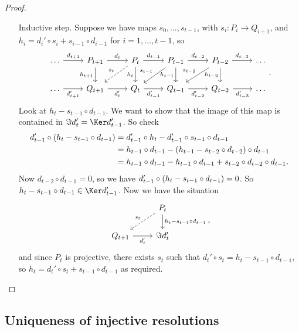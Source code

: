 \begin{proof}
\begin{enumerate}
\begin{itemize}[leftmargin=1in]
\item[Inductive step.] Suppose we have maps $ s_0, \dots, s_{t - 1} $, with $ s_i : P_i \to Q_{i + 1} $, and $ h_i = d_i' \circ s_i + s_{i - 1} \circ d_{i - 1} $ for $ i = 1, \dots, t - 1 $, so
$$
\begin{tikzcd}
\dots \arrow{r}{d_{t + 1}} & P_{t + 1} \arrow{r}{d_t} \arrow[swap]{d}{h_{t + 1}} & P_t \arrow{r}{d_{t - 1}} \arrow[dashed, swap]{dl}{s_t} \arrow[swap]{d}{h_t} & P_{t - 1} \arrow{r}{d_{t - 2}} \arrow[swap]{dl}{s_{t - 1}} \arrow[swap]{d}{h_{t - 1}} & P_{t - 2} \arrow{r}{d_{t - 3}} \arrow[swap]{dl}{s_{t - 2}} \arrow[swap]{d}{h_{t - 2}} & \dots \\
\dots \arrow[swap]{r}{d_{t + 1}'} & Q_{t + 1} \arrow[swap]{r}{d_t'} & Q_t \arrow[swap]{r}{d_{t - 1}'} & Q_{t - 1} \arrow[swap]{r}{d_{t - 2}'} & Q_{t - 2} \arrow[swap]{r}{d_{t - 3}'} & \dots
\end{tikzcd}.
$$
Look at $ h_t - s_{t - 1} \circ d_{t - 1} $. We want to show that the image of this map is contained in $ \Im d_t' = \Ker d_{t - 1}' $. So check
\begin{align*}
d_{t - 1}' \circ \br{h_t - s_{t - 1} \circ d_{t - 1}}
& = d_{t - 1}' \circ h_t - d_{t - 1}' \circ s_{t - 1} \circ d_{t - 1} \\
& = h_{t - 1} \circ d_{t - 1} - \br{h_{t - 1} - s_{t - 2} \circ d_{t - 2}} \circ d_{t - 1} \\
& = h_{t - 1} \circ d_{t - 1} - h_{t - 1} \circ d_{t - 1} + s_{t - 2} \circ d_{t - 2} \circ d_{t - 1}.
\end{align*}
Now $ d_{t - 2} \circ d_{t - 1} = 0 $, so we have $ d_{t - 1}' \circ \br{h_t - s_{t - 1} \circ d_{t - 1}} = 0 $. So $ h_t - s_{t - 1} \circ d_{t - 1} \in \Ker d_{t - 1}' $. Now we have the situation
$$
\begin{tikzcd}
& P_t \arrow[dashed, swap]{dl}{s_t} \arrow{d}{h_t - s_{t - 1} \circ d_{t - 1}} \\
Q_{t + 1} \arrow[swap]{r}{d_t'} & \Im d_t'
\end{tikzcd},
$$
and since $ P_t $ is projective, there exists $ s_t $ such that $ d_t' \circ s_t = h_t - s_{t - 1} \circ d_{t - 1} $, so $ h_t = d_t' \circ s_t + s_{t - 1} \circ d_{t - 1} $ as required.
\end{itemize}
\end{enumerate}
\end{proof}

\pagebreak

\subsection{Uniqueness of injective resolutions}

